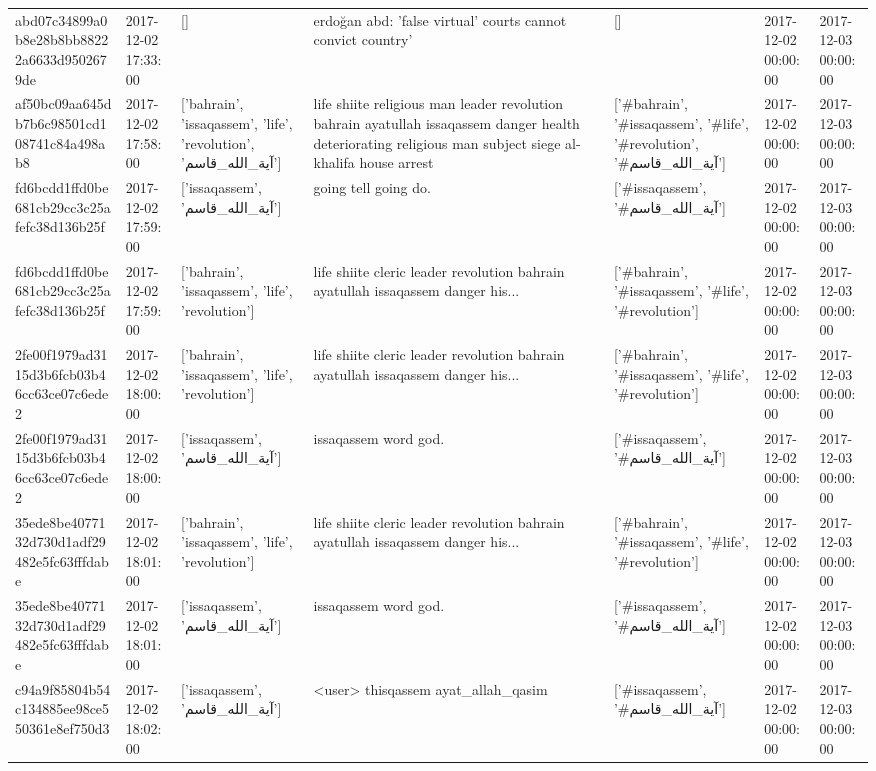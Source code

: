 \begin{tabular}{lllllll}
abd07c34899a0b8e28b8bb88222a6633d9502679de & 2017-12-02 17:33:00 & [] & erdoğan abd: 'false virtual' courts cannot convict country' & [] & 2017-12-02 00:00:00 & 2017-12-03 00:00:00 \\
af50bc09aa645db7b6c98501cd108741c84a498ab8 & 2017-12-02 17:58:00 & ['bahrain', 'issaqassem', 'life', 'revolution', 'آية_الله_قاسم'] & life shiite religious man leader revolution bahrain ayatullah issaqassem danger health deteriorating religious man subject siege al-khalifa house arrest & ['#bahrain', '#issaqassem', '#life', '#revolution', '#آية_الله_قاسم'] & 2017-12-02 00:00:00 & 2017-12-03 00:00:00 \\
fd6bcdd1ffd0be681cb29cc3c25afefc38d136b25f & 2017-12-02 17:59:00 & ['issaqassem', 'آية_الله_قاسم'] & going tell going do. & ['#issaqassem', '#آية_الله_قاسم'] & 2017-12-02 00:00:00 & 2017-12-03 00:00:00 \\
fd6bcdd1ffd0be681cb29cc3c25afefc38d136b25f & 2017-12-02 17:59:00 & ['bahrain', 'issaqassem', 'life', 'revolution'] & life shiite cleric leader revolution bahrain ayatullah issaqassem danger his... & ['#bahrain', '#issaqassem', '#life', '#revolution'] & 2017-12-02 00:00:00 & 2017-12-03 00:00:00 \\
2fe00f1979ad3115d3b6fcb03b46cc63ce07c6ede2 & 2017-12-02 18:00:00 & ['bahrain', 'issaqassem', 'life', 'revolution'] & life shiite cleric leader revolution bahrain ayatullah issaqassem danger his... & ['#bahrain', '#issaqassem', '#life', '#revolution'] & 2017-12-02 00:00:00 & 2017-12-03 00:00:00 \\
2fe00f1979ad3115d3b6fcb03b46cc63ce07c6ede2 & 2017-12-02 18:00:00 & ['issaqassem', 'آية_الله_قاسم'] & issaqassem word god. & ['#issaqassem', '#آية_الله_قاسم'] & 2017-12-02 00:00:00 & 2017-12-03 00:00:00 \\
35ede8be4077132d730d1adf29482e5fc63fffdabe & 2017-12-02 18:01:00 & ['bahrain', 'issaqassem', 'life', 'revolution'] & life shiite cleric leader revolution bahrain ayatullah issaqassem danger his... & ['#bahrain', '#issaqassem', '#life', '#revolution'] & 2017-12-02 00:00:00 & 2017-12-03 00:00:00 \\
35ede8be4077132d730d1adf29482e5fc63fffdabe & 2017-12-02 18:01:00 & ['issaqassem', 'آية_الله_قاسم'] & issaqassem word god. & ['#issaqassem', '#آية_الله_قاسم'] & 2017-12-02 00:00:00 & 2017-12-03 00:00:00 \\
c94a9f85804b54c134885ee98ce550361e8ef750d3 & 2017-12-02 18:02:00 & ['issaqassem', 'آية_الله_قاسم'] & <user> thisqassem ayat\_allah\_qasim & ['#issaqassem', '#آية_الله_قاسم'] & 2017-12-02 00:00:00 & 2017-12-03 00:00:00 \\

\end{tabular}
